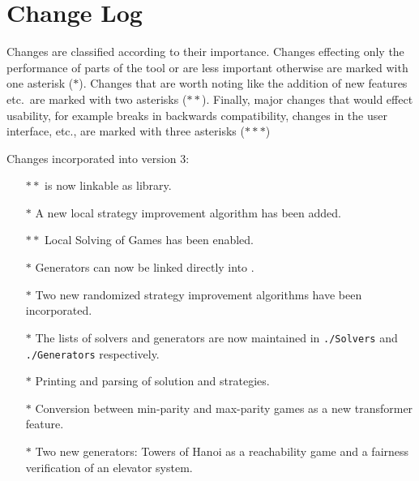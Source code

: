 \section{Change Log}

Changes are classified according to their importance. Changes effecting only the performance of
parts of the tool or are less important otherwise are marked with one asterisk ($\ast$). Changes
that are worth noting like the addition of new features etc.\ are marked with two asterisks 
($\ast\ast$). Finally, major changes that would effect usability, for example breaks in backwards
compatibility, changes in the user interface, etc., are marked with three asterisks ($\ast\ast\ast$)

Changes incorporated into version 3:
\begin{itemize}
\item[$\ast\ast$] \pgsolver is now linkable as library.
\item[$\ast$] A new local strategy improvement algorithm has been added.
\item[$\ast\ast$] Local Solving of Games has been enabled.
\item[$\ast$] Generators can now be linked directly into \pgsolver.
\item[$\ast$] Two new randomized strategy improvement algorithms have been incorporated.
\item[$\ast$] The lists of solvers and generators are now maintained in \texttt{./Solvers} and \texttt{./Generators} respectively.
\item[$\ast$] Printing and parsing of solution and strategies.
\item[$\ast$] Conversion between min-parity and max-parity games as a new transformer feature.
\item[$\ast$] Two new generators: Towers of Hanoi as a reachability game and a fairness verification of an elevator system.
\end{itemize} 



